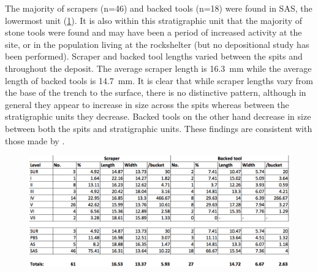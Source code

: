    The majority of scrapers (n=46) and backed tools (n=18) were found in SAS, the lowermost unit (\cref{fig:Forssman-Table04}). 
  It is also within this stratigraphic unit that the majority of stone tools were found and may have been a period of increased activity at the site, or in the population living at the rockshelter (but no depositional study has been performed). Scraper and backed tool lengths varied between the spits and throughout the deposit. The average scraper length is \SI{16.3}{\milli\meter} 
   while the average length of backed tools is \SI{14.7}{\milli\meter}. 
  It is clear that while scraper lengths vary from the base of the trench to the surface, there is no distinctive pattern, 
   although in general they appear to increase in size across the spits whereas between the stratigraphic units they decrease. Backed tools on the other hand decrease in size between both the spits and stratigraphic units. These findings are consistent with those made by \textcite[31]{Walker_1994}.
   
   	\begin{figure} %
   		\includegraphics[width=\linewidth]{figures/Forssman-Table04}
   		\centering
   		\label{fig:Forssman-Table04}
   	\end{figure}
   

